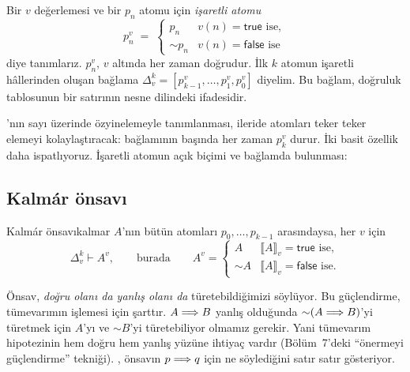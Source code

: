 Bir $v$ değerlemesi ve bir $p_n$ atomu için \emph{işaretli atomu}
\[
  p_n^v \;=\;
  \begin{cases}
    p_n        & v(n) = \mathsf{true} \text{ ise},\\
    {\sim}p_n  & v(n) = \mathsf{false} \text{ ise}
  \end{cases}
\]
diye tanımlarız. $p_n^v$, $v$ altında her zaman doğrudur. İlk $k$ atomun
işaretli hâllerinden oluşan bağlama $\Delta_v^k = [p_{k-1}^v, \dots,
p_1^v, p_0^v]$ diyelim. Bu bağlam, doğruluk tablosunun bir satırının
nesne dilindeki ifadesidir.


\noindent {}'nın sayı üzerinde özyinelemeyle tanımlanması,
ileride atomları teker teker elemeyi kolaylaştıracak:  bağlamının başında her zaman $p_k^v$ durur. İki basit özellik
daha ispatlıyoruz. İşaretli atomun açık biçimi ve bağlamda bulunması:


\subsection{Kalmár önsavı}

\begin{teorem}{Kalmár önsavı}{kalmar}
$A$'nın bütün atomları $p_0, \dots, p_{k-1}$ arasındaysa, her $v$ için
\[
  \Delta_v^k \vdash A^v,
  \qquad\text{burada}\qquad
  A^v =
  \begin{cases}
    A        & \lBrack A \rBrack_v = \mathsf{true} \text{ ise},\\
    {\sim}A  & \lBrack A \rBrack_v = \mathsf{false} \text{ ise}.
  \end{cases}
\]
\end{teorem}

\noindent Önsav, \emph{doğru olanı da yanlış olanı da} türetebildiğimizi
söylüyor. Bu güçlendirme, tümevarımın işlemesi için şarttır. $A \Longrightarrow B$
yanlış olduğunda ${\sim}(A \Longrightarrow B)$'yi türetmek için $A$'yı ve
${\sim}B$'yi türetebiliyor olmamız gerekir. Yani tümevarım hipotezinin
hem doğru hem yanlış yüzüne ihtiyaç vardır (Bölüm~7'deki ``önermeyi
güçlendirme'' tekniği). , önsavın $p \Longrightarrow q$ için
ne söylediğini satır satır gösteriyor.

